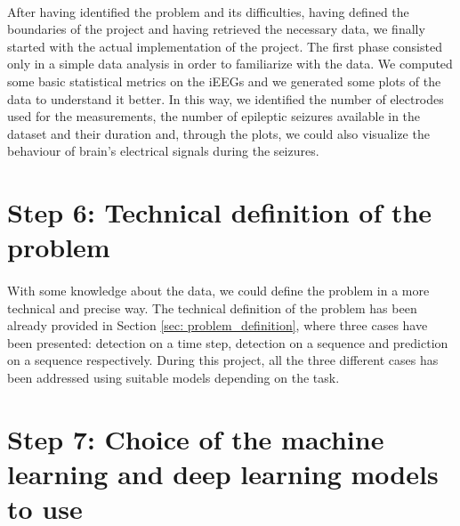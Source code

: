 \paragraph{} After having identified the problem and its difficulties, having defined the boundaries of the project and having retrieved the necessary data, we finally started with the actual implementation of the project. The first phase consisted only in a simple data analysis in order to familiarize with the data. We computed some basic statistical metrics on the iEEGs and we generated some plots of the data to understand it better. In this way, we identified the number of electrodes used for the measurements, the number of epileptic seizures available in the dataset and their duration and, through the plots, we could also visualize the behaviour of brain's electrical signals during the seizures.


\section{Step 6: Technical definition of the problem} \label{sec: step_technical_definition_problem}
\paragraph{} With some knowledge about the data, we could define the problem in a more technical and precise way. The technical definition of the problem has been already provided in Section \ref{sec: problem_definition}, where three cases have been presented: detection on a time step, detection on a sequence and prediction on a sequence respectively. During this project, all the three different cases has been addressed using suitable models depending on the task.


\section{Step 7: Choice of the machine learning and deep learning models to use} \label{sec: step_choice_models_to_use}
